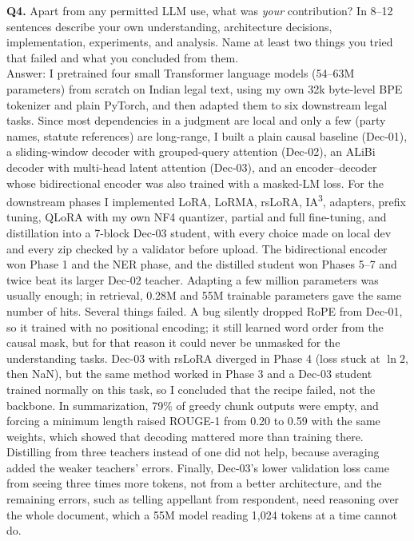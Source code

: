 \documentclass[11pt, oneside]{article}
\begin{document}
\medskip
\noindent
\textbf{Q4.} Apart from any permitted LLM use, what was \emph{your} contribution? In 8--12 sentences describe your own understanding, architecture decisions, implementation, experiments, and analysis. Name at least two things you tried that failed and what you concluded from them. \\[0.4em]

Answer: I pretrained four small Transformer language models (54--63M parameters) from scratch on Indian legal text, using my own 32k byte-level BPE tokenizer and plain PyTorch, and then adapted them to six downstream legal tasks. Since most dependencies in a judgment are local and only a few (party names, statute references) are long-range, I built a plain causal baseline (Dec-01), a sliding-window decoder with grouped-query attention (Dec-02), an ALiBi decoder with multi-head latent attention (Dec-03), and an encoder--decoder whose bidirectional encoder was also trained with a masked-LM loss. For the downstream phases I implemented LoRA, LoRMA, rsLoRA, IA\textsuperscript{3}, adapters, prefix tuning, QLoRA with my own NF4 quantizer, partial and full fine-tuning, and distillation into a 7-block Dec-03 student, with every choice made on local dev and every zip checked by a validator before upload. The bidirectional encoder won Phase 1 and the NER phase, and the distilled student won Phases 5--7 and twice beat its larger Dec-02 teacher. Adapting a few million parameters was usually enough; in retrieval, 0.28M and 55M trainable parameters gave the same number of hits. Several things failed. A bug silently dropped RoPE from Dec-01, so it trained with no positional encoding; it still learned word order from the causal mask, but for that reason it could never be unmasked for the understanding tasks. Dec-03 with rsLoRA diverged in Phase 4 (loss stuck at $\ln 2$, then NaN), but the same method worked in Phase 3 and a Dec-03 student trained normally on this task, so I concluded that the recipe failed, not the backbone. In summarization, 79\% of greedy chunk outputs were empty, and forcing a minimum length raised ROUGE-1 from 0.20 to 0.59 with the same weights, which showed that decoding mattered more than training there. Distilling from three teachers instead of one did not help, because averaging added the weaker teachers' errors. Finally, Dec-03's lower validation loss came from seeing three times more tokens, not from a better architecture, and the remaining errors, such as telling appellant from respondent, need reasoning over the whole document, which a 55M model reading 1,024 tokens at a time cannot do.




\end{document}
